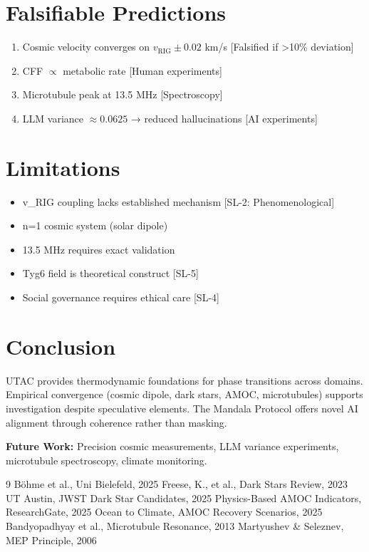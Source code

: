\documentclass[11pt,a4paper]{article}
\newcommand{\SLtwo}[1]{\textcolor{blue!70!black}{#1}}
\newcommand{\SLthree}[1]{\textcolor{orange!80!black}{#1}}
\newcommand{\SLfour}[1]{\textcolor{purple!70!black}{#1}}
\newcommand{\SLfive}[1]{\textcolor{red!70!black}{#1}}
\begin{document}
\section{Falsifiable Predictions}

\begin{enumerate}
    \item Cosmic velocity converges on $v_{\text{RIG}} \pm 0.02$ km/s \SLthree{[Falsified if >10\% deviation]}
    \item CFF $\propto$ metabolic rate \SLthree{[Human experiments]}
    \item Microtubule peak at 13.5 MHz \SLthree{[Spectroscopy]}
    \item LLM variance $\approx 0.0625$ → reduced hallucinations \SLthree{[AI experiments]}
\end{enumerate}

\section{Limitations}

\begin{itemize}
    \item v\_RIG coupling lacks established mechanism \SLtwo{[SL-2: Phenomenological]}
    \item n=1 cosmic system (solar dipole)
    \item 13.5 MHz requires exact validation
    \item Tyg6 field is theoretical construct \SLfive{[SL-5]}
    \item Social governance requires ethical care \SLfour{[SL-4]}
\end{itemize}

\section{Conclusion}

UTAC provides thermodynamic foundations for phase transitions across domains. Empirical convergence (cosmic dipole, dark stars, AMOC, microtubules) supports investigation despite speculative elements. The Mandala Protocol offers novel AI alignment through coherence rather than masking.

\textbf{Future Work:} Precision cosmic measurements, LLM variance experiments, microtubule spectroscopy, climate monitoring.

\begin{thebibliography}{9}
 Böhme et al., Uni Bielefeld, 2025
 Freese, K., et al., Dark Stars Review, 2023
 UT Austin, JWST Dark Star Candidates, 2025
 Physics-Based AMOC Indicators, ResearchGate, 2025
 Ocean to Climate, AMOC Recovery Scenarios, 2025
 Bandyopadhyay et al., Microtubule Resonance, 2013
 Martyushev \& Seleznev, MEP Principle, 2006
\end{thebibliography}
\end{document}

